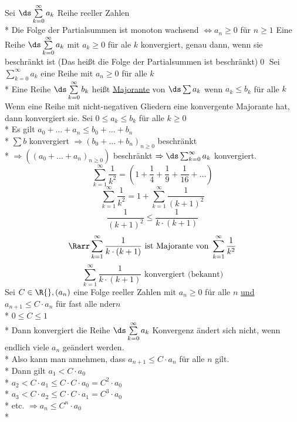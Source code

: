 \bem
Sei $\ds\sum\limits_{k=0}^{\infty} a_k$ Reihe reeller Zahlen\\*
Die Folge der Partialsummen ist monoton wachsend $\Leftrightarrow a_n \geq 0$ für $n \geq 1$
\Satz
Eine Reihe $\ds\sum\limits_{k=0}^{\infty} a_k$ mit $a_k \geq 0$ für ale $k$ konvergiert, genau dann, wenn sie beschränkt ist (Das heißt die Folge der Partialsummen ist beschränkt)\qed
\Def
Sei $\displaystyle\sum\limits_{k=0}^{\infty} a_k$ eine Reihe mit $a_n \geq 0$ für alle $k$\\*
Eine Reihe $\ds\sum\limits_{k=0}^{\infty} b_k$ heißt \ul{Majorante} von $\ds\sum a_k$ wenn $a_k \leq b_k$ für alle $k$
Wenn eine Reihe mit nicht-negativen Gliedern eine konvergente Majorante hat, dann konvergiert sie.
\bew
Sei $0 \leq a_k \leq b_k$ für alle $k \geq 0$\\*
Es gilt $a_0 + ... + a_n \leq b_0 + ... + b_n$ \\*
$\sum b$ konvergiert $\Rightarrow (b_0 + ... + b_n)_{n \geq 0}$  beschränkt\\*
$\Rightarrow ((a_0 + ... + a_n)_{n \geq 0})$ beschränkt $\Rightarrow \ds\sum_{k= 0}^{\infty} a_k$ konvergiert.
$$\sum\limits_{k=1}^{\infty} \frac{1}{k^2} = \left( 1 + \frac{1}{4} + \frac{1}{9}+ \frac{1}{16} + … \right)$$
$$\sum\limits_{k=1}^{\infty} \frac{1}{k^2} = 1 + \sum\limits_{k=1}^{\infty} \frac{1}{(k + 1)^2}$$
$$\frac{1}{(k + 1)^2} \leq \frac{1}{k \cdot (k + 1)}$$
$$\Rarr \sum\limits_{k=1}^{\infty} \frac{1}{k \cdot (k + 1)}\text{ ist Majorante von }\sum\limits_{k=1}^{\infty} \frac{1}{k^2}$$
$$\sum\limits_{k=1}^{\infty} \frac{1}{k \cdot (k + 1)}\text{ konvergiert (bekannt)}$$
Sei $C \in \R{}, (a_n)$ eine Folge reeller Zahlen mit $a_n \geq 0$ für alle $n$ \ul{und} $a_{n + 1} \leq C \cdot a_n$ für fast alle nder$n$\\*
$0 \leq C \leq 1$\\*
Dann konvergiert die Reihe $\ds\sum\limits_{k=0}^{\infty} a_k$
\bew
Konvergenz ändert sich nicht, wenn endlich viele $a_n$ geändert werden.\\*
Also kann man annehmen, dass $a_{n + 1} \leq C \cdot a_n$ für alle $n$ gilt.\\*
Dann gilt $a_1 < C \cdot a_0$\\*
$a_2 < C \cdot a_1 \leq C \cdot C \cdot a_0 = C^2 \cdot a_0$\\*
$a_3 < C \cdot a_2 \leq C \cdot C \cdot a_1 = C^3 \cdot a_0$\\*
etc. $\Rightarrow a_n \leq C^n \cdot a_0$\\*
